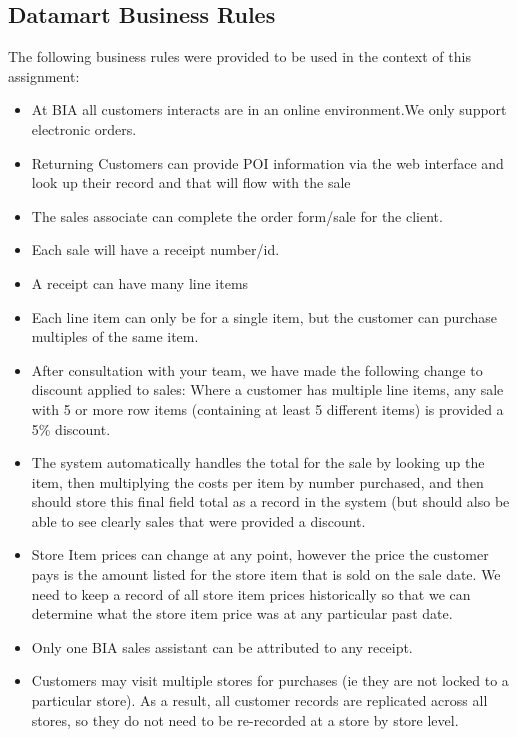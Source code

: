 \documentclass{article}
\begin{document}
    \subsection{Datamart Business Rules}
    The following business rules were provided to be used in the context of this assignment:
    \begin{itemize}
        \item At BIA all customers interacts are in an online environment.We only support electronic orders.
        \item Returning Customers can provide POI information via the web interface and look up their record 
        and that will flow with the sale
        \item The sales associate can complete the order form/sale for the client.
        \item Each sale will have a receipt number/id.
        \item A receipt can have many line items 
        \item Each line item can only be for a single item, but the customer can purchase multiples of the same item.
        \item After consultation with your team, we have made the following change to discount applied to sales: 
        Where a customer has multiple line items, any sale with 5 or more row items (containing at least 5 different items) 
        is provided a 5\% discount.
        \item The system automatically handles the total for the sale by looking up the item, then multiplying the costs 
        per item by number purchased, and then should store this final field total as a record in the system (but should
        also be able to see clearly sales that were provided a discount. 
        \item Store Item prices can change at any point, however the price the customer pays is the amount listed for the
        store item that is sold on the sale date. We need to keep a record of all store item prices historically so that 
        we can determine what the store item price was at any particular past date.
        \item Only one BIA sales assistant can be attributed to any receipt.
        \item Customers may visit multiple stores for purchases (ie they are not locked to a particular store). As a 
        result, all customer records are replicated across all stores, so they do not need to be re-recorded at a 
        store by store level.
    \end{itemize}
   
\end{document}
